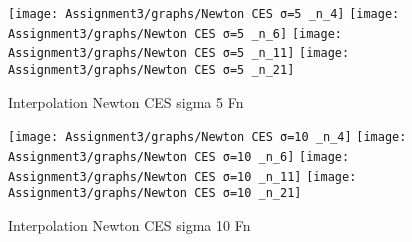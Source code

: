 \documentclass[]{article}
\begin{document}
\begin{figure}

{\centering \texttt{[image: Assignment3/graphs/Newton CES σ=5 \_n\_4]} \texttt{[image: Assignment3/graphs/Newton CES σ=5 \_n\_6]} \texttt{[image: Assignment3/graphs/Newton CES σ=5 \_n\_11]} \texttt{[image: Assignment3/graphs/Newton CES σ=5 \_n\_21]} 

}

\caption{Interpolation Newton CES sigma 5 Fn}\label{fig:unnamed-chunk-5}
\end{figure}

\begin{figure}

{\centering \texttt{[image: Assignment3/graphs/Newton CES σ=10 \_n\_4]} \texttt{[image: Assignment3/graphs/Newton CES σ=10 \_n\_6]} \texttt{[image: Assignment3/graphs/Newton CES σ=10 \_n\_11]} \texttt{[image: Assignment3/graphs/Newton CES σ=10 \_n\_21]} 

}

\caption{Interpolation Newton CES sigma 10 Fn}\label{fig:unnamed-chunk-6}
\end{figure}
\end{document}
